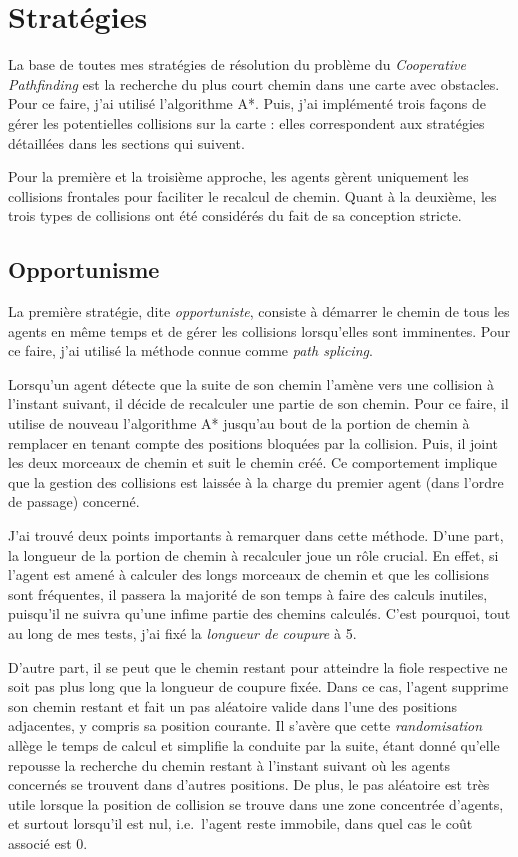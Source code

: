 \documentclass[letterpaper]{article}
\begin{document}
\section{Strat\'egies}
La base de toutes mes strat\'egies de r\'esolution du probl\`eme du \textit{Cooperative Pathfinding} est la recherche du plus court chemin dans une carte avec obstacles. 
Pour ce faire, j'ai utilis\'e l'algorithme A*.
Puis, j'ai impl\'ement\'e trois fa\c{c}ons de g\'erer les potentielles collisions sur la carte : elles correspondent aux strat\'egies d\'etaill\'ees dans les sections qui suivent.

Pour la premi\`ere et la troisi\`eme approche, les agents g\`erent uniquement les collisions frontales pour faciliter le recalcul de chemin. 
Quant \`a la deuxi\`eme, les trois types de collisions ont \'et\'e consid\'er\'es du fait de sa conception stricte.

\subsection{Opportunisme}
La premi\`ere strat\'egie, dite \textit{opportuniste}, consiste \`a d\'emarrer le chemin de tous les agents en m\^eme temps et de g\'erer les collisions lorsqu'elles sont imminentes.
Pour ce faire, j'ai utilis\'e la m\'ethode connue comme \textit{path splicing}.

Lorsqu'un agent d\'etecte que la suite de son chemin l'am\`ene vers une collision \`a l'instant suivant, il d\'ecide de recalculer une partie de son chemin.
Pour ce faire, il utilise de nouveau l'algorithme A* jusqu'au bout de la portion de chemin \`a remplacer en tenant compte des positions bloqu\'ees par la collision.
Puis, il joint les deux morceaux de chemin et suit le chemin cr\'e\'e.
Ce comportement implique que la gestion des collisions est laiss\'ee \`a la charge du premier agent (dans l'ordre de passage) concern\'e.

J'ai trouv\'e deux points importants \`a remarquer dans cette m\'ethode.
D'une part, la longueur de la portion de chemin \`a recalculer joue un r\^ole crucial.
En effet, si l'agent est amen\'e \`a calculer des longs morceaux de chemin et que les collisions sont fr\'equentes, il passera la majorit\'e de son temps \`a faire des calculs inutiles, puisqu'il ne suivra qu'une infime partie des chemins calcul\'es.
C'est pourquoi, tout au long de mes tests, j'ai fix\'e la \textit{longueur de coupure} \`a 5.

D'autre part, il se peut que le chemin restant pour atteindre la fiole respective ne soit pas plus long que la longueur de coupure fix\'ee.
Dans ce cas, l'agent supprime son chemin restant et fait un pas al\'eatoire valide dans l'une des positions adjacentes, y compris sa position courante.
Il s'av\`ere que cette \textit{randomisation} all\`ege le temps de calcul et simplifie la conduite par la suite, \'etant donn\'e qu'elle repousse la recherche du chemin restant \`a l'instant suivant o\`u les agents concern\'es se trouvent dans d'autres positions.
De plus, le pas al\'eatoire est tr\`es utile lorsque la position de collision se trouve dans une zone concentr\'ee d'agents, et surtout lorsqu'il est nul, i.e.\ l'agent reste immobile, dans quel cas le co\^ut associ\'e est 0.
\end{document}
